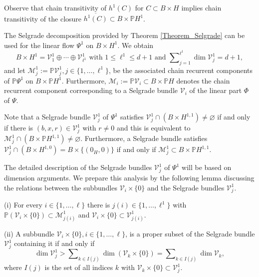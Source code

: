 	Observe that chain transitivity of $h^{1}(C)$ for $C\subset B\times H$ implies
	chain transitivity of the closure $\overline{h^{1}(C)}\subset B\times
	\mathbb{P}H^{1}$.
	
	The Selgrade decomposition provided by Theorem \ref{Theorem_Selgrade} can be
	used for the linear flow $\Psi^{1}$ on $B\times H^{1}$. We obtain
	\begin{equation}
		B\times H^{1}=\mathcal{V}_{1}^{1}\oplus\cdots\oplus\mathcal{V}_{\ell^{1}}%
		^{1}\mbox{ with }1\leq\ell^{1}\leq d+1\mbox{ and }\sum\nolimits_{j=1}%
		^{\ell^{1}}\dim\mathcal{V}_{j}^{1}=d+1, \label{Sel_1}%
	\end{equation}
	and let $\mathcal{M}_{j}^{1}:=\mathbb{P}\mathcal{V}_{j}^{1},j\in
	\{1,\ldots,\ell^{1}\}$, be the associated chain recurrent components of
	$\mathbb{P}\Psi^{1}$ on $B\times\mathbb{P}H^{1}$. Furthermore, $\mathcal{M}%
	_{i}:=\mathbb{P}\mathcal{V}_{i}\subset B\times\mathbb{P}H$ denotes the chain
	recurrent component corresponding to a Selgrade bundle $\mathcal{V}_{i}$ of
	the linear part $\Phi$ of $\Psi$.
	
	Note that a Selgrade bundle $\mathcal{V}_{j}^{1}$ of $\Psi^{1}$ satisfies
	$\mathcal{V}_{j}^{1}\cap\left(  B\times H^{1,1}\right)  \not =\varnothing$ if
	and only if there is $(b,x,r)\in\mathcal{V}_{j}^{1}$ with $r\not =0$ and this
	is equivalent to $\mathcal{M}_{j}^{1}\cap\left(  B\times\mathbb{P}%
	H^{1,1}\right)  \not =\varnothing$. Furthermore, a Selgrade bundle satisfies
	$\mathcal{V}_{j}^{1}\cap\left(  B\times H^{1,0}\right)  =B\times\{\left(  0_{H},0\right)  \}$ if
	and only if $\mathcal{M}_{j}^{1}\subset B\times\mathbb{P}H^{1,1}$.
	
	The detailed description of the Selgrade bundles $\mathcal{V}_{j}^{1}$ of
	$\Psi^{1}$ will be based on dimension arguments. We prepare this analysis by
	the following lemma discussing the relations between the subbundles
	$\mathcal{V}_{i}\times\{0\}$ and the Selgrade bundles $\mathcal{V}_{j}^{1}$.
	
	\begin{lemma}
		\label{Lemma_dim1}(i) For every $i\in\{1,\ldots,\ell\}$ there is
		$j(i)\in\{1,\ldots,\ell^{1}\}$ with $\mathbb{P}\left(  \mathcal{V}_{i}%
		\times\{0\}\right)  \allowbreak\subset\mathcal{M}_{j(i)}^{1}$ and
		$\mathcal{V}_{i}\times\{0\}\subset\mathcal{V}_{j(i)}^{1}$.
		
		(ii) A subbundle $\mathcal{V}_{i}\times\{0\},i\in\{1,\ldots,\ell\}$, is a
		proper subset of the Selgrade bundle $\mathcal{V}_{j}^{1}$ containing it if
		and only if
		\begin{equation}
			\dim\mathcal{V}_{j}^{1}>\sum\nolimits_{k\in I(j)}\dim\left(  \mathcal{V}%
			_{k}\times\{0\}\right)  =\sum\nolimits_{k\in I(j)}\dim\mathcal{V}_{k},
			\label{dim4}%
		\end{equation}
		where $I(j)$ is the set of all indices $k$ with $\mathcal{V}_{k}%
		\times\{0\}\subset\mathcal{V}_{j}^{1}$.
	\end{lemma}
	
